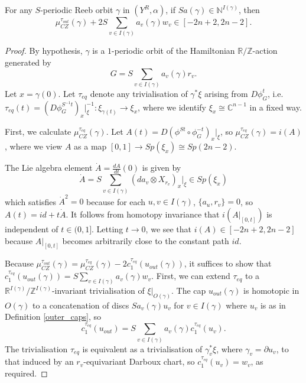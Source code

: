 \documentclass{article}
\numberwithin{equation}{section}
\numberwithin{figure}{section}
\begin{document}
\begin{lem}
\label{integral_orbit_index}
    For any $S$-periodic Reeb orbit $\gamma$ in $(Y^R,\alpha)$, if $Sa(\gamma)\in\mathbb{N}^{I(\gamma)}$, then
    \begin{equation}
        \mu_{CZ}^{\tau_{out}}(\gamma)+2S\sum_{v\in I(\gamma)}a_v(\gamma)w_v\in [-2n+2,2n-2].
    \end{equation}
\end{lem}
\begin{proof}
By hypothesis, $\gamma$ is a $1$-periodic orbit of the Hamiltonian $\mathbb{R}/\mathbb{Z}$-action generated by
\begin{equation}
G=S\sum_{v\in I(\gamma)}a_v(\gamma)r_v.
\end{equation}
Let $x=\gamma(0)$. Let $\tau_{eq}$ denote any trivialisation of $\gamma^*\xi$ arising from $D\phi^t_G$, i.e. $\tau_{eq}(t)=(D\phi_G^{S^{-1}t})_x|_\xi^{-1}:\xi_{\gamma(t)}\rightarrow \xi_x$, where we identify $\xi_x\cong\mathbb{C}^{n-1}$ in a fixed way.

First, we calculate $\mu_{CZ}^{\tau_{eq}}(\gamma)$. Let $A(t)=D(\phi^{St}\circ \phi_G^{-t})_x|_\xi$, so $\mu_{CZ}^{\tau_{eq}}(\gamma)=i(A)$, where we view $A$ as a map $[0,1]\rightarrow Sp(\xi_x)\cong Sp(2n-2)$.

The Lie algebra element $\dot{A}=\frac{dA}{dt}(0)$ is given by
\begin{equation}
\label{lie_element}
    \dot{A}=S\sum_{v\in I(\gamma)}\left(da_v\otimes X_{r_v}\right)_x|_\xi\in Sp(\xi_x)
\end{equation}
which satisfies $\dot{A}^2=0$ because for each $u,v\in I(\gamma)$, $\{a_u,r_v\}=0$, so $A(t)=id+t\dot{A}$. It follows from homotopy invariance that $i(A|_{[0,t]})$ is independent of $t\in (0,1]$. Letting $t\to 0$, we see that $i(A)\in [-2n+2,2n-2]$ because $A|_{[0,t]}$ becomes arbitrarily close to the constant path $id$.

Because $\mu_{CZ}^{\tau_{out}}(\gamma)=\mu_{CZ}^{\tau_{eq}}(\gamma)-2c_1^{\tau_{eq}}(u_{out}(\gamma))$, it suffices to show that $c_1^{\tau_{eq}}(u_{out}(\gamma))=S\sum_{v\in I(\gamma)}a_v(\gamma)w_v$.  First, we can extend $\tau_{eq}$ to a $\mathbb{R}^{I(\gamma)}/\mathbb{Z}^{I(\gamma)}$-invariant trivialisation of $\xi|_{O(\gamma)}$. The cap $u_{out}(\gamma)$ is homotopic in $O(\gamma)$ to a concatenation of discs $Sa_v(\gamma)u_v$ for $v\in I(\gamma)$ where $u_v$ is as in Definition \ref{outer_caps}, so
\begin{equation}
    c_1^{\tau_{eq}}(u_{out})=S\sum_{v\in I(\gamma)}a_v(\gamma)c_1^{\tau_{eq}}(u_v).
\end{equation}
The trivialisation $\tau_{eq}$ is equivalent as a trivialisation of $\gamma_v^*\xi$, where $\gamma_v=\partial u_v$, to that induced by an $r_v$-equivariant Darboux chart, so $c_1^{\tau_{eq}}(u_v)=w_v$, as required.
\end{proof}
\end{document}
